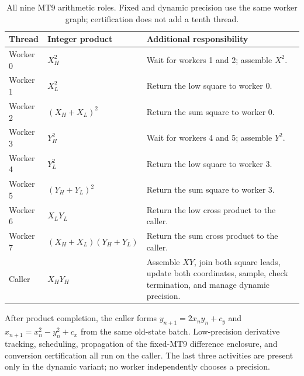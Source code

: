 \begin{table}[!htbp]
\centering
\small
\caption[MT9 thread ownership]{All nine MT9 arithmetic roles. Fixed and dynamic
  precision use the same worker graph; certification does not add a tenth thread.}
\label{tab:mt9-worker-roles}
\begin{tabularx}{\textwidth}{l l X}
\hline
\textbf{Thread} & \textbf{Integer product} & \textbf{Additional responsibility} \\
\hline
Worker 0 & $X_H^2$ & Wait for workers 1 and 2; assemble $X^2$. \\
Worker 1 & $X_L^2$ & Return the low square to worker 0. \\
Worker 2 & $(X_H+X_L)^2$ & Return the sum square to worker 0. \\
Worker 3 & $Y_H^2$ & Wait for workers 4 and 5; assemble $Y^2$. \\
Worker 4 & $Y_L^2$ & Return the low square to worker 3. \\
Worker 5 & $(Y_H+Y_L)^2$ & Return the sum square to worker 3. \\
Worker 6 & $X_LY_L$ & Return the low cross product to the caller. \\
Worker 7 & $(X_H+X_L)(Y_H+Y_L)$ & Return the sum cross product to the caller. \\
Caller & $X_HY_H$ & Assemble $XY$, join both square leads, update both
  coordinates, sample, check termination, and manage dynamic precision. \\
\hline
\end{tabularx}
\end{table}

After product completion, the caller forms $y_{n+1}=2x_ny_n+c_y$ and
$x_{n+1}=x_n^2-y_n^2+c_x$ from the same old-state batch. Low-precision
derivative tracking, scheduling, propagation of the fixed-MT9 difference enclosure, and conversion
certification all run on the caller. The last three activities are present
only in the dynamic variant; no worker independently chooses a precision.

